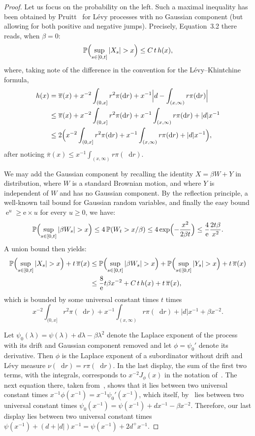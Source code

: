 \documentclass[british, a4paper,11pt]{article}
\numberwithin{equation}{section}
\theoremstyle{definition}
\renewcommand{\P}{\mathop{}\!\mathbb{P}}
\newcommand{\e}{\operatorname{e}}
\renewcommand{\d}{\mathop{}\!\mathrm{d}}
\begin{document}
\begin{proof}
Let us focus on the probability on the left.
Such a maximal inequality has been obtained by Pruitt~\cite{Pruitt81} for L\'evy processes with no Gaussian component (but allowing for both positive and negative jumps).
Precisely, Equation~3.2 there reads, when $\beta=0$:
\[\P\Bigl(\sup_{s \in [0,t]} |X_{s}| > x\Bigr) \leq C\, t\, h(x),\]
where, taking note of the difference in the convention for the L\'evy--Khintchine formula,
\begin{align*}
h(x)
&= \overline{\pi}(x) + x^{-2} \int_{(0,x]} r^{2} \pi(\d r) + x^{-1} \Bigl|d - \int_{(x,\infty)} r \pi(\d r)\Bigr|
\\
&\le \overline{\pi}(x) + x^{-2} \int_{(0,x]} r^{2} \pi(\d r) + x^{-1} \int_{(x,\infty)} r \pi(\d r) + |d| x^{-1}
\\
&\le 2 \Bigl(x^{-2} \int_{(0,x]} r^{2} \pi(\d r) + x^{-1} \int_{(x,\infty)} r \pi(\d r) + |d| x^{-1}\Bigr)
,\end{align*}
after noticing $\overline{\pi}(x) \leq x^{-1} \int_{(x, \infty)} r \pi(\d r)$.

We may add the Gaussian component by recalling the identity $X=\beta W + Y$ in distribution, where $W$ is a standard Brownian motion, and where $Y$ is independent of $W$ and has no Gaussian component.
By the reflection principle, a well-known tail bound for Gaussian random variables, and finally the easy bound $\e^{u} \ge \mathrm{e} \times u$ for every $u \ge 0$,
we have:
\[\P\Bigl(\sup_{s \in [0,t]} |\beta W_{s}| > x\Bigr)
\leq 4 \P(W_{t} > x/\beta)
\leq 4 \exp\Bigl(-\frac{x^{2}}{2 \beta t}\Bigr)
\leq \frac{4}{\mathrm{e}} \frac{2 t \beta}{x^{2}}
.\]
A union bound then yields:
\begin{align*}
\P\Bigl(\sup_{s \in [0,t]} |X_{s}| > x\Bigr) + t\, \overline{\pi}(x) 
&\le \P\Bigl(\sup_{s \in [0,t]} |\beta W_{s}| > x\Bigr) + \P\Bigl(\sup_{s \in [0,t]} |Y_{s}| > x\Bigr) + t\, \overline{\pi}(x) 
\\
&\leq \frac{8}{\mathrm{e}} t \beta x^{-2} + C\, t\, h(x) + t\, \overline{\pi}(x) 
,\end{align*}
which is bounded by some universal constant times $t$ times
\[x^{-2} \int_{(0,x]} r^{2} \pi(\d r) + x^{-1} \int_{(x,\infty)} r \pi(\d r) + |d| x^{-1} + \beta x^{-2}.\]


Let $\psi_0(\lambda) = \psi(\lambda)+d\lambda-\beta \lambda^2$ denote the Laplace exponent of the process with its drift and Gaussian component removed and let $\phi=\psi_0'$ denote its derivative. Then $\phi$ is the Laplace exponent of a subordinator without drift and L\'evy measure $\nu(\d r) = r \pi(\d r)$. In the last display, the sum of the first two terms, with the integrals, corresponds to $x^{-2} J_\phi(x)$ in the notation of~\cite[Equation~47]{Duq12}. The next equation there, taken from~\cite[Proposition~III.1]{Ber96}, shows that it lies between two universal constant times $x^{-1} \phi(x^{-1}) = x^{-1} \psi_0'(x^{-1})$, which itself, by~\cite[Equation~50]{Duq12} lies between two universal constant times $\psi_0(x^{-1})=\psi(x^{-1})+dx^{-1}-\beta x^{-2}$.
Therefore, our last display lies between two universal constant times
$\psi(x^{-1})+(d+|d|) x^{-1} = \psi(x^{-1})+2d^+ x^{-1}$.
\end{proof}
\end{document}

